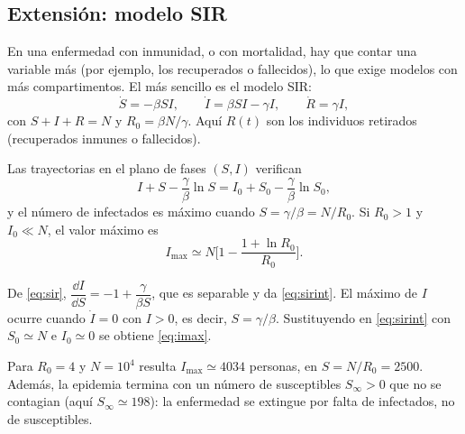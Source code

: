 \documentclass[11pt,twoside]{article}
\begin{document}
\subsection{Extensión: modelo SIR}

En una enfermedad con inmunidad, o con mortalidad, hay que contar una variable más (por ejemplo, los recuperados o
fallecidos), lo que exige modelos con más compartimentos. El más sencillo es el modelo SIR:
\begin{equation}\label{eq:sir}
\dot S=-\beta SI,\qquad\dot I=\beta SI-\gamma I,\qquad\dot R=\gamma I,
\end{equation}
con $S+I+R=N$ y $R_0=\beta N/\gamma$. Aquí $R(t)$ son los individuos retirados (recuperados inmunes o fallecidos).

\begin{proposicion}\label{prop:sir}
Las trayectorias en el plano de fases $(S,I)$ verifican
\begin{equation}\label{eq:sirint}
I+S-\frac\gamma\beta\ln S=I_0+S_0-\frac\gamma\beta\ln S_0,
\end{equation}
y el número de infectados es máximo cuando $S=\gamma/\beta=N/R_0$. Si $R_0>1$ y $I_0\ll N$, el valor máximo es
\begin{equation}\label{eq:imax}
I_{\max}\simeq N\Big[1-\frac{1+\ln R_0}{R_0}\Big].
\end{equation}
\end{proposicion}

\begin{demostracion}
De \eqref{eq:sir}, $\dfrac{\dd I}{\dd S}=-1+\dfrac{\gamma}{\beta S}$, que es separable y da \eqref{eq:sirint}. El máximo de $I$
ocurre cuando $\dot I=0$ con $I>0$, es decir, $S=\gamma/\beta$. Sustituyendo en \eqref{eq:sirint} con $S_0\simeq N$ e
$I_0\simeq0$ se obtiene \eqref{eq:imax}.
\end{demostracion}

\begin{observacion}
Para $R_0=4$ y $N=10^4$ resulta $I_{\max}\simeq4034$ personas, en $S=N/R_0=2500$. Además, la epidemia termina con un número
de susceptibles $S_\infty>0$ que no se contagian (aquí $S_\infty\simeq198$): la enfermedad se extingue por falta de
infectados, no de susceptibles.
\end{observacion}
\end{document}

